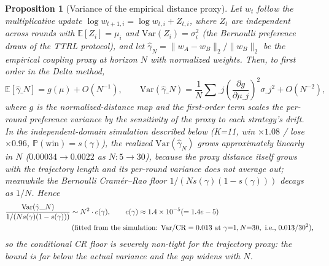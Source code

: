 \documentclass[11pt]{article}
\newtheorem{proposition}{Proposition}
\begin{document}
\begin{proposition}[Variance of the empirical distance proxy]\label{thm:proxy-var}
Let $w_t$ follow the multiplicative update $\log w_{t+1,i}=\log w_{t,i}+Z_{t,i}$, where $Z_t$ are independent across rounds with $\mathbb{E}[Z_i]=\mu_i$ and $\mathrm{Var}(Z_i)=\sigma_i^2$ (the Bernoulli preference draws of the TTRL protocol), and let $\hat\gamma_N=\|w_A-w_B\|_2/\|w_B\|_2$ be the empirical coupling proxy at horizon $N$ with normalized weights. Then, to first order in the Delta method,
\begin{equation}
\mathbb{E}[\hat\gamma\_N] = g(\mu)+O(N^{-1}), \qquad
\mathrm{Var}(\hat\gamma\_N) = \frac{1}{N}\sum\_j \left(\frac{\partial g}{\partial \mu\_j}\right)^2 \sigma\_j^2 + O(N^{-2}),
\end{equation}
where $g$ is the normalized-distance map and the first-order term scales the per-round preference variance by the sensitivity of the proxy to each strategy's drift. In the independent-domain simulation described below (K{=}11, win $\times1.08$ / lose $\times0.96$, $\mathbb{P}(\text{win})=s(\gamma)$), the realized $\mathrm{Var}(\hat\gamma_N)$ grows approximately linearly in $N$ ($0.00034 \to 0.0022$ as $N{:}5{\to}30$), because the proxy distance itself grows with the trajectory length and its per-round variance does not average out; meanwhile the Bernoulli Cram\'{e}r--Rao floor $1/(N s(\gamma)(1-s(\gamma)))$ decays as $1/N$. Hence
\begin{equation}
\begin{split}
\frac{\mathrm{Var}(\hat\gamma\_N)}{1/(N s(\gamma)(1-s(\gamma)))} &\sim N^2 \cdot c(\gamma), \qquad c(\gamma)\approx 1.4\times10^{-5} (=1.4e-5) \\
&\text{\,(fitted from the simulation: }\mathrm{Var}/\mathrm{CR}=0.013 \text{ at }\gamma{=}1, N{=}30,\text{ i.e., }0.013/30^2\text{),}
\end{split}
\end{equation}
so the conditional CR floor is severely non-tight for the trajectory proxy: the bound is far below the actual variance and the gap widens with $N$.
\end{proposition}
\end{document}
